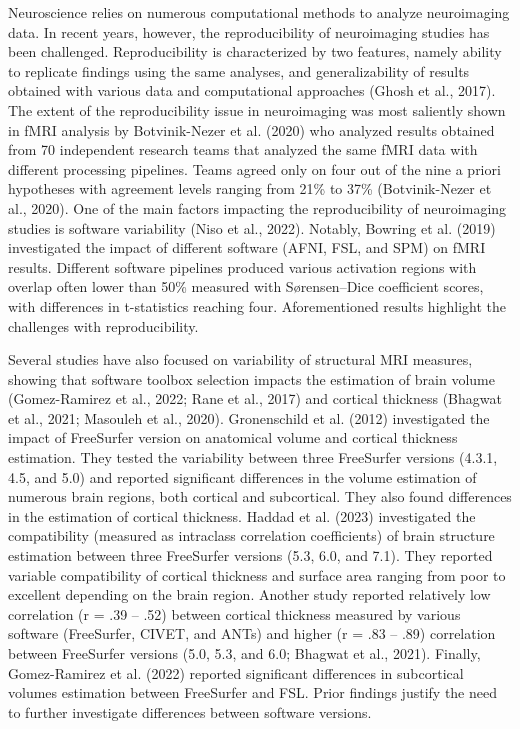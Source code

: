 \documentclass[11pt]{article}
\begin{document}
Neuroscience relies on numerous computational methods to analyze neuroimaging data. In recent years, however, the
reproducibility of neuroimaging studies has been challenged. Reproducibility is characterized by two features,
namely ability to replicate findings using the same analyses, and generalizability of results obtained with
various data and computational approaches (Ghosh et al., 2017). The extent of the reproducibility issue in
neuroimaging was most saliently shown in fMRI analysis by Botvinik-Nezer et al. (2020) who analyzed results
obtained from 70 independent research teams that analyzed the same fMRI data with different processing pipelines.
Teams agreed only on four out of the nine a priori hypotheses with agreement levels ranging from 21\% to 37\%
(Botvinik-Nezer et al., 2020). One of the main factors impacting the reproducibility of neuroimaging studies is
software variability (Niso et al., 2022). Notably, Bowring et al. (2019) investigated the impact of different
software (AFNI, FSL, and SPM) on fMRI results. Different software pipelines produced various activation regions
with overlap often lower than 50\% measured with Sørensen--Dice coefficient scores, with differences in
t-statistics reaching four. Aforementioned results highlight the challenges with reproducibility.

Several studies have also focused on variability of structural MRI measures, showing that software toolbox
selection impacts the estimation of brain volume (Gomez-Ramirez et al., 2022; Rane et al., 2017) and cortical
thickness (Bhagwat et al., 2021; Masouleh et al., 2020). Gronenschild et al. (2012) investigated the impact of
FreeSurfer version on anatomical volume and cortical thickness estimation. They tested the variability between
three FreeSurfer versions (4.3.1, 4.5, and 5.0) and reported significant differences in the volume estimation of
numerous brain regions, both cortical and subcortical. They also found differences in the estimation of cortical
thickness. Haddad et al. (2023) investigated the compatibility (measured as intraclass correlation coefficients)
of brain structure estimation between three FreeSurfer versions (5.3, 6.0, and 7.1). They reported variable
compatibility of cortical thickness and surface area ranging from poor to excellent depending on the brain region.
 Another study reported
relatively low correlation (r = .39 -- .52) between cortical thickness measured by various software (FreeSurfer,
CIVET, and ANTs) and higher (r = .83 -- .89) correlation between FreeSurfer versions (5.0, 5.3, and 6.0; Bhagwat
et al., 2021). Finally, Gomez-Ramirez et al. (2022) reported significant differences in subcortical volumes
estimation between FreeSurfer and FSL. Prior findings justify the need to further investigate differences between
software versions.
\end{document}
